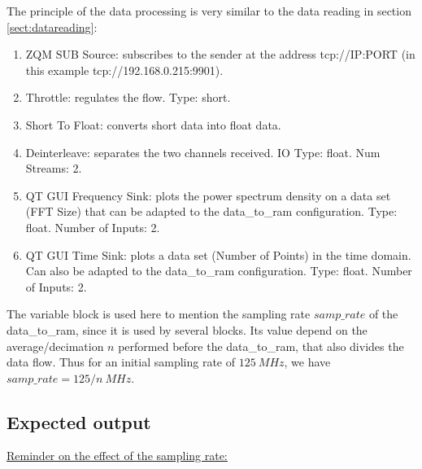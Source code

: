 \documentclass[12pt,oneside]{article}
\begin{document}
The principle of the data processing is very similar to the data reading in section \ref{sect:datareading}: 

\begin{enumerate}
	\setlength\itemsep{-0cm}
	\item ZQM SUB Source: subscribes to the sender at the address tcp://IP:PORT (in this example tcp://192.168.0.215:9901).
	\item Throttle: regulates the flow. Type: short.
	\item Short To Float: converts short data into float data.
	\item Deinterleave: separates the two channels received. IO Type: float. Num Streams: 2.
	\item QT GUI Frequency Sink: plots the power spectrum density on a data set (FFT Size) that can be adapted to the data\_to\_ram configuration. Type: float. Number of Inputs: 2.
	\item QT GUI Time Sink: plots a data set (Number of Points) in the time domain. Can also be adapted to the data\_to\_ram configuration. Type: float. Number of Inputs: 2.
\end{enumerate}
\vspace{0.4cm}
The variable block is used here to mention the sampling rate $samp\_rate$ of the data\_to\_ram, since it is used by several blocks. Its value depend on the average/decimation $n$ performed before the data\_to\_ram, that also divides the data flow. Thus for an initial sampling rate of $125~MHz$, we have $samp\_rate=125/n~MHz$.

\vspace{0.cm}
\subsection{Expected output}\label{sect:expOMon}
\vspace{0.4cm}
\underline{Reminder on the effect of the sampling rate:}\newline
\end{document}
